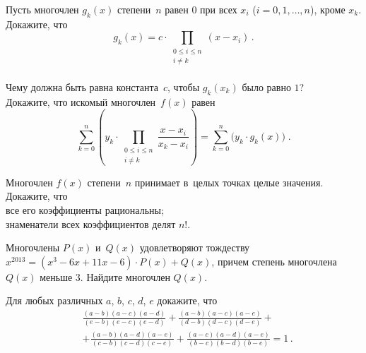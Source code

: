\begin{problems}

\item
\subproblem
Пусть многочлен $g_{k}(x)$ степени~$n$ равен $0$ при всех $x_{i}$
($i = 0, 1, \ldots, n$), кроме $x_{k}$.
Докажите, что
\[
    g_{k}(x)
=
    c \cdot \prod_{\substack{0 \leq i \leq n \\ i \neq k}}
        (x - x_{i})
\, . \]
\\
\subproblem
Чему должна быть равна константа~$c$, чтобы $g_{k}(x_{k})$ было равно $1$?
\\
\subproblem
{}
Докажите, что искомый многочлен~$f(x)$ равен
\[
    \sum_{k=0}^{n}
        \left(
            y_{k} \cdot
            \prod_{\substack{0 \leq i \leq n \\ i \neq k}}
                \dfrac{x - x_{i}}{x_{k} - x_{i}}
        \right)
=
    \sum_{k=0}^{n}
        \bigl( y_{k} \cdot g_{k}(x) \bigr)
\; . \]

\item
Многочлен $f(x)$ степени~$n$ принимает в~целых точках целые значения.
Докажите, что
\\
\subproblem
все его коэффициенты рациональны;
\\
\subproblem
знаменатели всех коэффициентов делят $n!$.

\item
Многочлены $P(x)$ и~$Q(x)$ удовлетворяют тождеству
$x^{2013} = (x^{3} - 6 x + 11 x - 6) \cdot P(x) + Q(x)$, причем степень
многочлена $Q(x)$ меньше $3$.
Найдите многочлен $Q(x)$.

\item
Для любых различных $a$, $b$, $c$, $d$, $e$ докажите, что
\begin{align*} &
    \frac{(a - b) (a - c) (a - d)}{(e - b) (e - c) (e - d)} +
    \frac{(a - b) (a - c) (a - e)}{(d - b) (d - c) (d - e)}
    + \\ & +
    \frac{(a - b) (a - d) (a - e)}{(c - b) (c - d) (c - e)} +
    \frac{(a - c) (a - d) (a - e)}{(b - c) (b - d) (b - e)}
=
    1
\, . \end{align*}

\end{problems}

